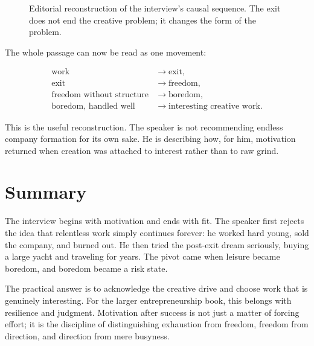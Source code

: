 \begin{figure}
\centering
{}
\caption{Editorial reconstruction of the interview's causal sequence. The exit does not end the creative problem; it changes the form of the problem.}
\end{figure}

The whole passage can now be read as one movement:

\begin{align}
\text{work} &\longrightarrow \text{exit},\\
\text{exit} &\longrightarrow \text{freedom},\\
\text{freedom without structure} &\longrightarrow \text{boredom},\\
\text{boredom, handled well} &\longrightarrow \text{interesting creative work}.
\end{align}

This is the useful reconstruction. The speaker is not recommending endless company formation for its own sake. He is describing how, for him, motivation returned when creation was attached to interest rather than to raw grind.

\section{Summary}

The interview begins with motivation and ends with fit. The speaker first rejects the idea that relentless work simply continues forever: he worked hard young, sold the company, and burned out. He then tried the post-exit dream seriously, buying a large yacht and traveling for years. The pivot came when leisure became boredom, and boredom became a risk state.

The practical answer is to acknowledge the creative drive and choose work that is genuinely interesting. For the larger entrepreneurship book, this belongs with resilience and judgment. Motivation after success is not just a matter of forcing effort; it is the discipline of distinguishing exhaustion from freedom, freedom from direction, and direction from mere busyness.